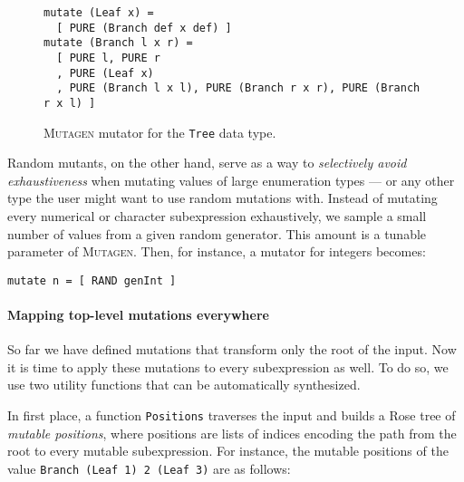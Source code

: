 \documentclass[sigconf,review,anonymous]{acmart}
\newcommand{\mutagen}{\textsc{Mutagen}\xspace}
\begin{document}
\begin{figure}[b]
\begin{verbatim}
mutate (Leaf x) =
  [ PURE (Branch def x def) ]
mutate (Branch l x r) =
  [ PURE l, PURE r
  , PURE (Leaf x)
  , PURE (Branch l x l), PURE (Branch r x r), PURE (Branch r x l) ]
\end{verbatim}
\vspace{-5pt}
\caption{\label{fig:mutagen:mutator}\mutagen mutator for the \texttt{Tree} data
  type.}
\vspace{-5pt}
\end{figure}

%
Random mutants, on the other hand, serve as a way to \emph{selectively avoid
  exhaustiveness} when mutating values of large enumeration types --- or any
other type the user might want to use random mutations with.
%
Instead of mutating every numerical or character subexpression exhaustively, we
sample a small number of values from a given random generator.
%
This amount is a tunable parameter of \mutagen.
%
Then, for instance, a mutator for integers becomes:

\begin{verbatim}
mutate n = [ RAND genInt ]
\end{verbatim}


\paragraph{Mapping top-level mutations everywhere}

So far we have defined mutations that transform only the root of the input.
%
Now it is time to apply these mutations to every subexpression as well.
%
To do so, we use two utility functions that can be automatically synthesized.

In first place, a function \texttt{Positions} traverses the input and builds a
Rose tree of \emph{mutable positions}, where positions are lists of indices
encoding the path from the root to every mutable subexpression.
%
%
%
%
For instance, the mutable positions of the value \texttt{Branch (Leaf 1) 2
  (Leaf 3)} are as follows:
\end{document}
